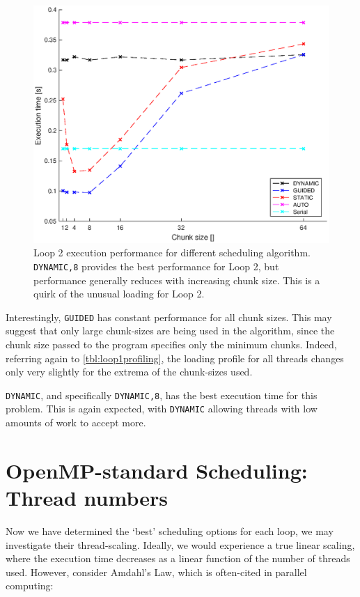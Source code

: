 \documentclass{article} %
\newcommand{\tp}{\texttt}
\begin{document}
\begin{figure}
    \centering
    \includegraphics[height=.35\textheight]{part1_plots/all_part2.eps}
    \caption{Loop 2 execution performance for different scheduling algorithm. \tp{DYNAMIC,8} provides the best performance for Loop 2, but performance generally reduces with increasing chunk size.
    This is a quirk of the unusual loading for Loop 2.}
    \label{fig:loop2results}
\end{figure}

Interestingly, \tp{GUIDED} has constant performance for all chunk sizes.
This may suggest that only large chunk-sizes are being used in the algorithm, since the chunk size passed to the program specifies only the minimum chunks. 
Indeed, referring again to \ref{tbl:loop1profiling}, the loading profile for all threads changes only very slightly for the extrema of the chunk-sizes used.

\tp{DYNAMIC}, and specifically \tp{DYNAMIC,8}, has the best execution time for this problem. This is again expected, with \tp{DYNAMIC} allowing threads with low amounts of work to accept more.

\section*{OpenMP-standard Scheduling: Thread numbers}

Now we have determined the `best' scheduling options for each loop, we may investigate their thread-scaling.
Ideally, we would experience a true linear scaling, where the execution time decreases as a linear function of the number of threads used.
However, consider Amdahl's Law, which is often-cited in parallel computing:
\end{document}
